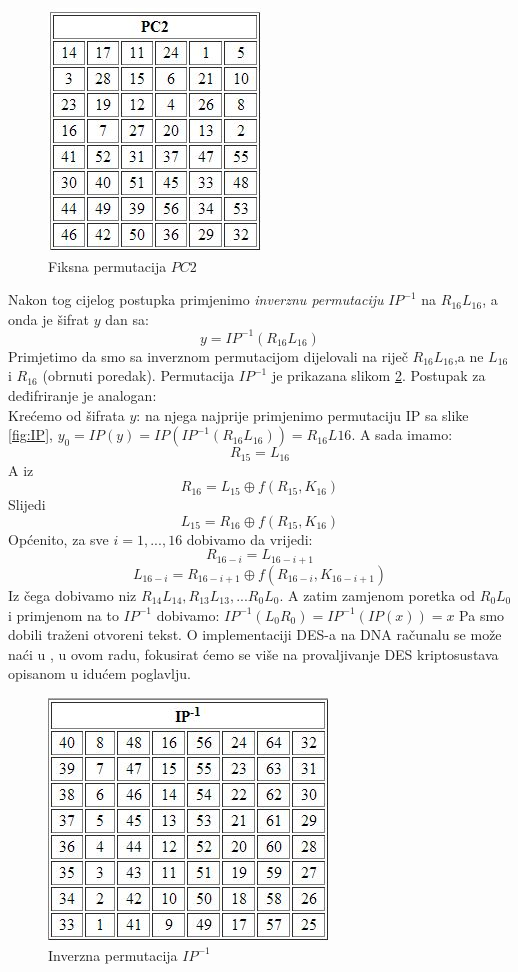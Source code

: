 \documentclass[a4paper,oneside,12pt]{memoir} %
\begin{document}
\begin{spacing}{1.5}
\begin{figure}[h]
\centering \includegraphics[scale=0.8]{PC2.jpg}
\caption{Fiksna permutacija $PC2$}
\label{fig:PC2}
\end{figure}

Nakon tog cijelog postupka primjenimo \textit{inverznu permutaciju} $IP^{-1}$ na $R_{16}L_{16}$, a onda je šifrat $y$ dan sa:
\[y=IP^{-1}(R_{16}L_{16})\]
Primjetimo da smo sa inverznom permutacijom dijelovali na riječ $R_{16}L_{16}$,a ne $L_{16}$ i $R_{16}$ (obrnuti poredak). Permutacija $IP^{-1}$ je prikazana slikom \ref{fig:invIP}.
Postupak za deđifriranje je analogan:\\
Krećemo od šifrata $y$: na njega najprije primjenimo permutaciju IP sa slike \ref{fig:IP}, $y_0=IP(y)=IP(IP^{-1}(R_{16}L_{16}))=R_{16}L{16}$.  A sada imamo:
\[R_{15}=L_{16}\]
A iz 
\[R_{16}=L_{15} \oplus f(R_{15}, K_{16})\]
Slijedi
\[L_{15}=R_{16} \oplus f(R_{15}, K_{16})\]
Općenito, za sve $i=1,...,16$ dobivamo da vrijedi:
\[R_{16-i}=L_{16-i+1}\]
\[L_{16-i}=R_{16-i+1} \oplus f(R_{16-i}, K_{16-i+1})\]
Iz čega dobivamo niz $R_{14}L_{14},R_{13}L_{13},...R_{0}L_{0}$. A zatim zamjenom poretka od $R_{0}L_{0}$ i primjenom na to $IP^{-1}$ dobivamo:
$IP^{-1}(L_0R_0)=IP^{-1}(IP(x))=x$
Pa smo dobili traženi otvoreni tekst. O implementaciji DES-a na DNA računalu se može naći u \cite{DESDNA}, u ovom radu, fokusirat ćemo se više na provaljivanje DES kriptosustava opisanom u idućem poglavlju.
\begin{figure}[h]
\centering \includegraphics[scale=0.7]{invIP.jpg}
\caption{Inverzna permutacija $IP^{-1}$}
\label{fig:invIP}
\end{figure}


\end{spacing}
\end{document}
